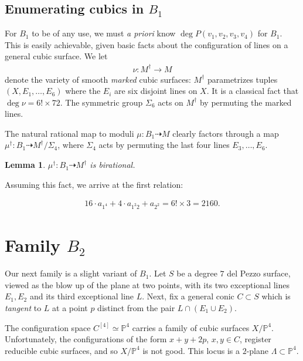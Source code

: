 \documentclass[12 pt]{amsart}
\newtheorem{lemma}{Lemma}[section]
\renewcommand{\P}{\mathbb{P}}
\newcommand{\<}{\left\langle}
\renewcommand{\>}{\right\rangle}
\begin{document}
\subsection{Enumerating cubics in $B_1$}
\label{sec:enum-cubics-b_1}


For $B_1$ to be of any use, we must {\sl a priori} know
$\deg P(v_{1},v_{2},v_{3},v_{4})$ for $B_1$. This is easily
achievable, given basic facts about the configuration of lines on a
general cubic surface. We let
\begin{align}
  \label{eq:nu}
  \nu: M^{\dagger} \to M
  \end{align}
  denote the variety of smooth {\sl marked} cubic surfaces:
  $M^{\dagger}$ parametrizes tuples $(X, E_{1}, \dots, E_{6})$ where
  the $E_{i}$ are six disjoint lines on $X$. It is a classical fact
  that $\deg \nu = 6! \times 72$. The symmetric group $\Sigma_6$ acts
  on $M^{\dagger}$ by permuting the marked lines.

  The natural rational map to moduli $\mu : B_1 \dashrightarrow M$
  clearly factors through a map
  $\mu^{\dagger}: B_1 \dashrightarrow M^{\dagger}/\Sigma_{4}$, where
  $\Sigma_{4}$ acts by permuting the last four lines
  $E_{3}, \dots, E_{6}$.

  \begin{lemma}
    \label{lemma:degreemudaggerB1}
    $\mu^{\dagger}: B_1 \dashrightarrow M^{\dagger}$ is birational.
  \end{lemma}

Assuming this fact, we arrive at the first relation:

\begin{align}
  \label{eq:relation1}
  16 \cdot a_{1^4} + 4 \cdot a_{1^2 2} + a_{2^2} = 6! \times 3 = 2160.
\end{align}

\section{Family $B_2$}
\label{sec:family-b_2}

Our next family is a slight variant of $B_1$. Let $S$ be a degree $7$
del Pezzo surface, viewed as the blow up of the plane at two points,
with its two exceptional lines $E_1, E_2$ and its third exceptional
line $L$.  Next, fix a general conic $C \subset S$ which is {\sl
  tangent} to $L$ at a point $p$ distinct from the pair
$L \cap (E_1 \cup E_2)$.

The configuration space $C^{[4]} \simeq \P^{4}$ carries a family of
cubic surfaces $X/\P^{4}$.  Unfortunately, the configurations of the
form $x+y+2p$, $x,y \in C$, register reducible cubic surfaces, and so
$X/\P^{4}$ is not good.  This locus is a $2$-plane
$\Lambda \subset \P^{4}$.
\end{document}
